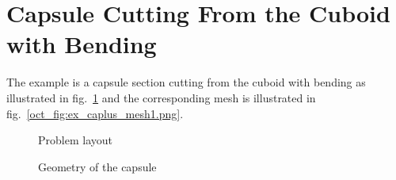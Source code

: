 \section{Capsule Cutting From the Cuboid with Bending}
The example is a capsule section cutting from the cuboid with bending as illustrated in fig.~\ref{oct_fig:ex_caplus_layout} and the corresponding mesh is illustrated in fig.~\ref{oct_fig:ex_caplus_mesh1.png}.
\begin{figure}[h!]
  \centering
  \caption{Problem layout}
  \label{oct_fig:ex_caplus_layout}
\end{figure}

\begin{figure}[h!]
  \centering
  \caption{Geometry of the capsule}
  \label{oct_fig:ex_caplus_geo}
\end{figure}


